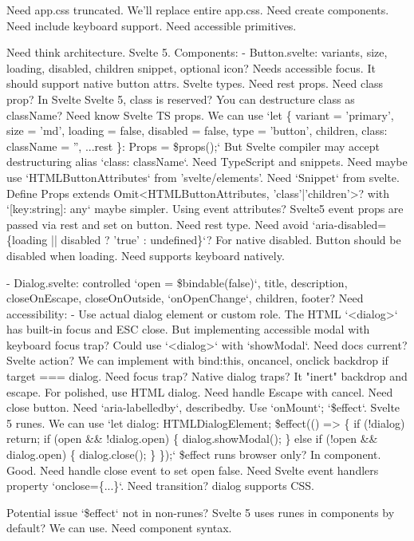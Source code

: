 \begin{decodedreasoningpanel}
Need app.css truncated.  We'll replace entire app.css. Need create components. Need include keyboard support. Need accessible primitives.

Need think architecture. Svelte 5. Components:
- Button.svelte: variants, size, loading, disabled, children snippet, optional icon?  Needs accessible focus. It should support native button attrs. Svelte types. Need rest props. Need class prop? In Svelte Svelte 5, class is reserved? You can destructure class as className? Need know Svelte TS props. We can use `let \{ variant = 'primary', size = 'md', loading = false, disabled = false, type = 'button', children, class: className = '', ...rest \}: Props = \$props();` But Svelte compiler may accept destructuring alias `class: className`. Need TypeScript and snippets. Need maybe use `HTMLButtonAttributes` from 'svelte/elements'. Need `Snippet` from svelte. Define Props extends Omit<HTMLButtonAttributes, 'class'|'children'>? with `[key:string]: any` maybe simpler. Using event attributes? Svelte5 event props are passed via rest and set on button. Need rest type. Need avoid `aria-disabled=\{loading || disabled ? 'true' : undefined\}`? For native disabled. Button should be disabled when loading. Need supports keyboard natively.

- Dialog.svelte: controlled `open = \$bindable(false)`, title, description, closeOnEscape, closeOnOutside, `onOpenChange`, children, footer? Need accessibility:
  - Use actual dialog element or custom role. The HTML `<dialog>` has built-in focus and ESC close. But implementing accessible modal with keyboard focus trap? Could use `<dialog>` with `showModal`. Need docs current? Svelte action? We can implement with bind:this, oncancel, onclick backdrop if target === dialog. Need focus trap? Native dialog traps? It "inert" backdrop and escape. For polished, use HTML dialog. Need handle Escape with cancel. Need close button. Need `aria-labelledby`, describedby. Use `onMount`; `\$effect`. Svelte 5 runes. We can use `let dialog: HTMLDialogElement; \$effect(() => \{ if (!dialog) return; if (open \&\& !dialog.open) \{ dialog.showModal(); \} else if (!open \&\& dialog.open) \{ dialog.close(); \} \});` \$effect runs browser only? In component. Good. Need
handle close event to set open false. Need Svelte event handlers property `onclose=\{...\}`. Need transition? dialog supports CSS.

Potential issue `\$effect` not in non-runes? Svelte 5 uses runes in components by default? We can use. Need component syntax.


\end{decodedreasoningpanel}
